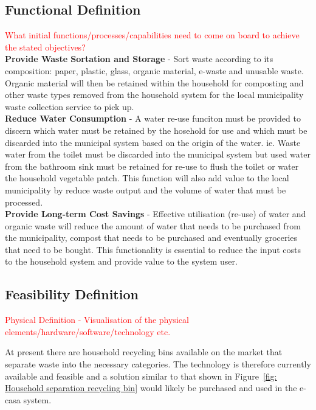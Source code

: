 \documentclass[a4paper,11pt,fleqn]{report}
\begin{document}
\subsection{Functional Definition}
\textcolor{red}{What initial functions/processes/capabilities need to come on board to
achieve the stated objectives?}\\

\noindent\textbf{Provide Waste Sortation and Storage} - Sort waste according to its composition: paper, plastic, glass, organic material, e-waste and unusable waste. Organic material will then be retained within the household for composting and other waste types removed from the household system for the local municipality waste collection service to pick up.\\

\noindent\textbf{Reduce Water Consumption} - A water re-use funciton must be provided to discern which water must be retained by the hosehold for use and which must be discarded into the municipal system based on the origin of the water. ie. Waste water from the toilet must be discarded into the municipal system but used water from the bathroom sink must be retained for re-use to flush the toilet or water the household vegetable patch. This function will also add value to the local municipality by reduce waste output and the volume of water that must be processed.\\

\noindent\textbf{Provide Long-term Cost Savings} - Effective utilisation (re-use) of water and organic waste will reduce the amount of water that needs to be purchased from the municipality, compost that needs to be purchased and eventually groceries that need to be bought. This functionality is essential to reduce the input costs to the household system and provide value to the system user.

\subsection{Feasibility Definition}
\textcolor{red}{Physical Definition - Visualisation of the physical elements/hardware/software/technology etc.} 

At present there are household recycling bins available on the market that separate waste into the necessary categories. The technology is therefore currently available and feasible and a solution similar to that shown in Figure~\ref{fig: Household separation recycling bin} would likely be purchased and used in the \ac{e-casa} system.
\end{document}
